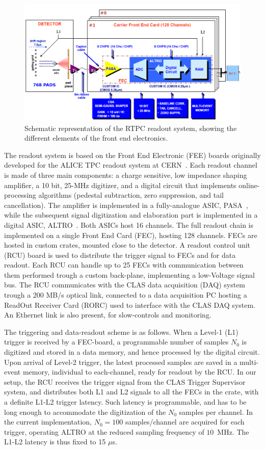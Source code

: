 \documentclass[preprint,5p]{elsarticle}
\begin{document}
\begin{figure}[tb]
   \centering
   \includegraphics[width=.75\textwidth]{fig/ReadoutScheme.png}
   \caption[]{Schematic representation of the RTPC readout system, showing
   the different elements of the front end electronics.} 
   \label{fig:ReadoutScheme}
\end{figure}

The readout system is based on the Front End Electronic (FEE) boards originally 
developed for the ALICE TPC readout system at CERN~\cite{ALICE-FEE}. Each 
readout channel is made of three main components: a charge sensitive, low 
impedance shaping amplifier, a 10 bit, 25-MHz digitizer, and a digital circuit 
that implements online-processing algorithms (pedestal subtraction, zero 
suppression, and tail cancellation). The amplifier is implemented in a 
fully-analogue ASIC, PASA~\cite{ALICE-PASA}, while the subsequent signal 
digitization and elaboration part is implemented in a digital ASIC, 
ALTRO~\cite{ALICE-ALTRO}. Both ASICs host 16 channels. The full readout 
chain is implemented on a single Front End Card (FEC), hosting 128 channels. 
FECs are hosted in custom crates, mounted close to the detector. A readout 
control unit (RCU) board is used to distribute the trigger signal to FECs 
and for data readout. Each RCU can handle up to 25 FECs with communication 
between them performed trough a 
custom back-plane, implementing a low-Voltage signal bus. The RCU communicates 
with the CLAS data acquisition (DAQ) system 
trough a 200 MB/s optical link, connected to a data acquisition PC hosting 
a ReadOut Receiver Card (RORC) used to interface with 
the CLAS DAQ system. An Ethernet link is also present, for slow-controls and 
monitoring.

The triggering and data-readout scheme is as follows. When a Level-1 (L1) trigger 
is received by a FEC-board, a programmable number of samples $N_0$ is digitized 
and stored in a data memory, and hence processed by the digital circuit. Upon 
arrival of Level-2 trigger, the latest processed samples are saved in a 
multi-event memory, individual to each-channel, ready for readout by the RCU.  
In our setup, the RCU receives the trigger signal from the CLAS Trigger 
Supervisor system, and distributes both L1 and L2 signals to all the FECs in 
the crate, with a definite L1-L2 trigger latency. Such latency is programmable, 
and has to be long enough to accommodate the digitization of the $N_0$ samples 
per channel.  In the current implementation, $N_0=100$ samples/channel are 
acquired for each trigger, operating ALTRO at the reduced sampling frequency of 
$10$~MHz. The L1-L2 latency is thus fixed to 15 $\mu$s.
\end{document}
